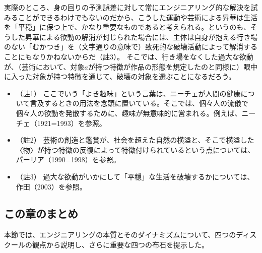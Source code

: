 実際のところ、身の回りの予測誤差に対して常にエンジニアリング的な解決を試みることができるわけでもないのだから、こうした運動や芸術による昇華は生活を「平穏」に保つ上で、かなり重要なものであると考えられる。というのも、そうした昇華による欲動の解消が封じられた場合には、主体は自身が抱える行き場のない「むかつき」を（文字通りの意味で）致死的な破壊活動によって解消することにもなりかねないからだ（註3）。
そこでは、行き場をなくした過大な欲動が、（芸術において、対象\(a\)が持つ特徴が作品の形態を規定したのと同様に）眼中に入った対象が持つ特徴を通じて、破壊の対象を選ぶことになるだろう。

\begin{itemize}
\tightlist
\item
  （註1）
  ここでいう「よき趣味」という言葉は、ニーチェが人間の健康について言及するときの用法を念頭に置いている。そこでは、個々人の流儀で個々人の欲動を発散するために、趣味が無意味的に営まれる。例えば、ニーチェ（1921=1993）\cite{Nietzsche3}を参照。
\item
  （註2）
  芸術の創造と鑑賞が、社会を超えた自然の横溢と、そこで横溢した〈物〉が持つ特徴の反復によって特徴付けられているという点については、パーリア（1990=1998）\cite{Paglia}を参照。
\item
  （註3）
  過大な欲動がいかにして「平穏」な生活を破壊するかについては、作田（2003）\cite{Sakuta}を参照。
\end{itemize}

\subsection{この章のまとめ}\label{ux3053ux306eux7ae0ux306eux307eux3068ux3081}

本節では、エンジニアリングの本質とそのダイナミズムについて、四つのディスクールの観点から説明し、さらに重要な四つの布石を提示した。

